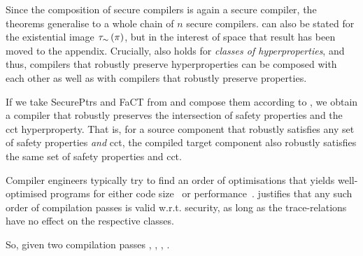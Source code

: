 \documentclass[acmsmall]{acmart}
\theoremstyle{definition}
\begin{document}
Since the composition of secure compilers is again a secure compiler, the theorems generalise to a whole chain of $n$ secure compilers. 
% 
 can also be stated for the existential image $\tau_\sim\left(\mathsf{\pi}\right)$, but in the interest of space that result has been moved to the appendix.
% 
Crucially,  also holds for \emph{classes of hyperproperties}, and thus, compilers that robustly preserve hyperproperties can be composed with each other as well as with compilers that robustly preserve properties.
% 
% 


If we take SecurePtrs and FaCT from  and compose them according to , we obtain a compiler that robustly preserves the intersection of safety properties and the \gls*{cct} hyperproperty. 
That is, for a source component that robustly satisfies any set of safety properties {\em and} \gls*{cct}, the compiled target component also robustly satisfies the same set of safety properties and \gls*{cct}.

Compiler engineers typically try to find an order of optimisations that yields well-optimised programs for either code size~\cite{cooper1999geneticphases} or performance~\cite{kulkarni2006exhaustivephase}.
 justifies that any such order of compilation passes is valid w.r.t. security, as long as the trace-relations have no effect on the respective classes.

So, given two compilation passes , , , .
% 
\end{document}
